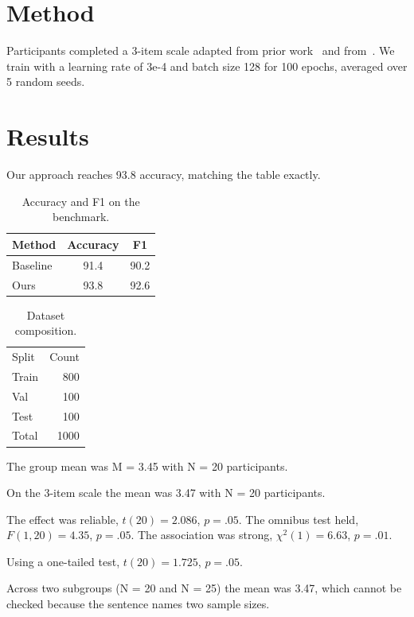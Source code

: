 \documentclass{article}
\begin{document}
\section{Method}

Participants completed a 3-item scale adapted from prior
work~\cite{dosovitskiy2020,hu2021lora} and from~\cite{accented2019}.
We train with a learning rate of 3e-4 and batch size 128 for 100 epochs,
averaged over 5 random seeds.

\section{Results}

Our approach reaches 93.8 accuracy, matching the table exactly.

\begin{table}[t]
  \caption{Accuracy and F1 on the benchmark.}
  \begin{tabular}{lcc}
    \toprule
    Method & Accuracy & F1 \\
    \midrule
    Baseline & 91.4 & 90.2 \\
    Ours     & 93.8 & 92.6 \\
    \bottomrule
  \end{tabular}
\end{table}

\begin{table}
  \caption{Dataset composition.}
  \begin{tabular}{lr}
    Split & Count \\
    Train & 800 \\
    Val   & 100 \\
    Test  & 100 \\
    Total & 1000 \\
  \end{tabular}
\end{table}

The group mean was M = 3.45 with N = 20 participants.

On the 3-item scale the mean was 3.47 with N = 20 participants.

The effect was reliable, $t(20) = 2.086$, $p = .05$.
The omnibus test held, $F(1, 20) = 4.35$, $p = .05$.
The association was strong, $\chi^2(1) = 6.63$, $p = .01$.

Using a one-tailed test, $t(20) = 1.725$, $p = .05$.

Across two subgroups (N = 20 and N = 25) the mean was 3.47, which cannot be
checked because the sentence names two sample sizes.
\end{document}
